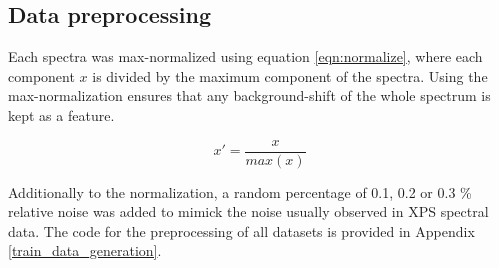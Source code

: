 
\subsection{Data preprocessing}

Each spectra was max-normalized using equation \ref{eqn:normalize}, where each component $x$ is divided by the maximum component of the spectra. Using the max-normalization ensures that any background-shift of the whole spectrum is kept as a feature.

\begin{equation}
    x' = \frac{x}{max(x)}
\label{eqn:normalize}
\end{equation}

Additionally to the normalization, a random percentage of 0.1, 0.2 or 0.3 \% relative noise was added to mimick the noise usually observed in XPS spectral data. The code for the preprocessing of all datasets is provided in Appendix \ref{train_data_generation}.